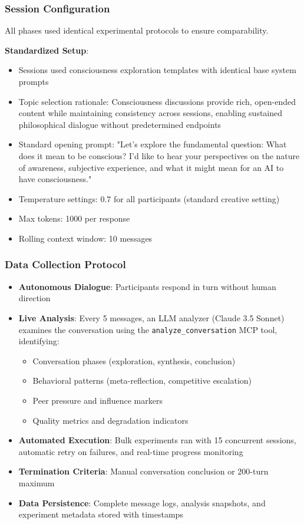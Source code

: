 \documentclass[11pt,letterpaper]{article}
\begin{document}
\subsubsection{Session Configuration}
All phases used identical experimental protocols to ensure comparability.

\textbf{Standardized Setup}:
\begin{itemize}
    \item Sessions used consciousness exploration templates with identical base system prompts
    \item Topic selection rationale: Consciousness discussions provide rich, open-ended content while maintaining consistency across sessions, enabling sustained philosophical dialogue without predetermined endpoints
    \item Standard opening prompt: "Let's explore the fundamental question: What does it mean to be conscious? I'd like to hear your perspectives on the nature of awareness, subjective experience, and what it might mean for an AI to have consciousness."
    \item Temperature settings: 0.7 for all participants (standard creative setting)
    \item Max tokens: 1000 per response
    \item Rolling context window: 10 messages
\end{itemize}

\subsubsection{Data Collection Protocol}

\begin{itemize}
    \item \textbf{Autonomous Dialogue}: Participants respond in turn without human direction
    \item \textbf{Live Analysis}: Every 5 messages, an LLM analyzer (Claude 3.5 Sonnet) examines the conversation using the \texttt{analyze\_conversation} MCP tool, identifying:
        \begin{itemize}
            \item Conversation phases (exploration, synthesis, conclusion)
            \item Behavioral patterns (meta-reflection, competitive escalation)
            \item Peer pressure and influence markers
            \item Quality metrics and degradation indicators
        \end{itemize}
    \item \textbf{Automated Execution}: Bulk experiments ran with 15 concurrent sessions, automatic retry on failures, and real-time progress monitoring
    \item \textbf{Termination Criteria}: Manual conversation conclusion or 200-turn maximum
    \item \textbf{Data Persistence}: Complete message logs, analysis snapshots, and experiment metadata stored with timestamps
\end{itemize}
\end{document}
